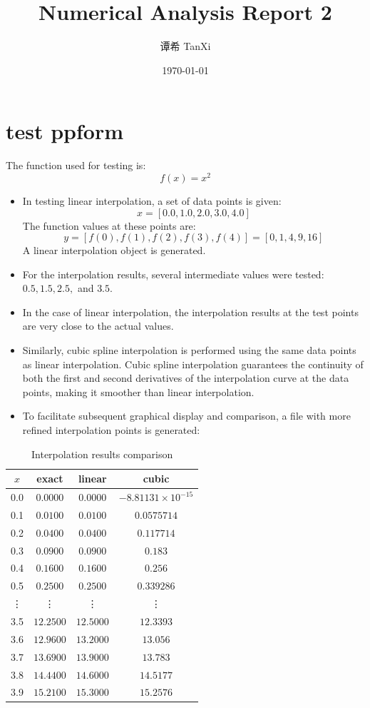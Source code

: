 \documentclass[a4paper]{article}
\title{Numerical Analysis Report 2}
\author[1]{谭希 TanXi}
\affil[1]{Zhejiang University, Email: \texttt{3220100027@zju.edu.cn}}
\date{\today}
\begin{document}
\maketitle

\section*{test ppform}
The function used for testing is:
\[
f(x) = x^2
\]

\begin{itemize}
    \item In testing linear interpolation, a set of data points is given:
    \[
    x = [0.0, 1.0, 2.0, 3.0, 4.0]
    \]
    The function values at these points are:
    \[
    y = [f(0), f(1), f(2), f(3), f(4)] = [0, 1, 4, 9, 16]
    \]
    A linear interpolation object is generated.
    
    \item For the interpolation results, several intermediate values were tested: \( 0.5, 1.5, 2.5, \) and \( 3.5 \).
    
    \item In the case of linear interpolation, the interpolation results at the test points are very close to the actual values.
    
    \item Similarly, cubic spline interpolation is performed using the same data points as linear interpolation. Cubic spline interpolation guarantees the continuity of both the first and second derivatives of the interpolation curve at the data points, making it smoother than linear interpolation.
    
    \item To facilitate subsequent graphical display and comparison, a file with more refined interpolation points is generated:
\end{itemize}

\begin{table}[H]
\centering
\begin{tabular}{|c|c|c|c|}
\hline
$x$ & exact & linear & cubic \\
\hline
0.0 & $0.0000$ & $0.0000$ & $-8.81131 \times 10^{-15}$ \\
0.1 & $0.0100$ & $0.0100$ & $0.0575714$ \\
0.2 & $0.0400$ & $0.0400$ & $0.117714$ \\
0.3 & $0.0900$ & $0.0900$ & $0.183$ \\
0.4 & $0.1600$ & $0.1600$ & $0.256$ \\
0.5 & $0.2500$ & $0.2500$ & $0.339286$ \\
\vdots & \vdots & \vdots & \vdots \\
3.5 & $12.2500$ & $12.5000$ & $12.3393$ \\
3.6 & $12.9600$ & $13.2000$ & $13.056$ \\
3.7 & $13.6900$ & $13.9000$ & $13.783$ \\
3.8 & $14.4400$ & $14.6000$ & $14.5177$ \\
3.9 & $15.2100$ & $15.3000$ & $15.2576$ \\
\hline
\end{tabular}
\caption{Interpolation results comparison}
\end{table}
\end{document}
